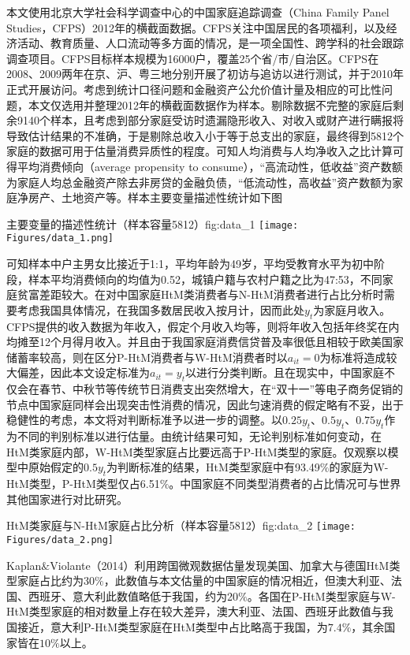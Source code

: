 \documentclass[supercite]{HustGraduPaper}
\begin{document}
    本文使用北京大学社会科学调查中心的中国家庭追踪调查（China Family Panel Studies，CFPS）2012年的横截面数据。CFPS关注中国居民的各项福利，以及经济活动、教育质量、人口流动等多方面的情况，是一项全国性、跨学科的社会跟踪调查项目。CFPS目标样本规模为16000户，覆盖25个省/市/自治区。CFPS在2008、2009两年在京、沪、粤三地分别开展了初访与追访以进行测试，并于2010年正式开展访问。考虑到统计口径问题和金融资产公允价值计量及相应的可比性问题，本文仅选用并整理2012年的横截面数据作为样本。剔除数据不完整的家庭后剩余9140个样本，且考虑到部分家庭受访时遗漏隐形收入、对收入或财产进行瞒报将导致估计结果的不准确，于是剔除总收入小于等于总支出的家庭，最终得到5812个家庭的数据可用于估量消费异质性的程度。可知人均消费与人均净收入之比计算可得平均消费倾向（average propensity to consume），“高流动性，低收益”资产数额为家庭人均总金融资产除去非房贷的金融负债，“低流动性，高收益”资产数额为家庭净房产、土地资产等。样本主要变量描述性统计如下图
    \begin{generalfig}[htbp]{主要变量的描述性统计（样本容量5812）}{fig:data_1}
    \texttt{[image: Figures/data\_1.png]}
    \end{generalfig}
    
    可知样本中户主男女比接近于1:1，平均年龄为49岁，平均受教育水平为初中阶段，样本平均消费倾向的均值为0.52，城镇户籍与农村户籍之比为47:53，不同家庭贫富差距较大。在对中国家庭HtM类消费者与N-HtM消费者进行占比分析时需要考虑我国具体情况，在我国多数居民收入按月计，因而此处$y_t$为家庭月收入。CFPS提供的收入数据为年收入，假定个月收入均等，则将年收入包括年终奖在内均摊至12个月得月收入。并且由于我国家庭消费信贷普及率很低且相较于欧美国家储蓄率较高，则在区分P-HtM消费者与W-HtM消费者时以$a_{it}=0$为标准将造成较大偏差，因此本文设定标准为$a_{it}=y_t$以进行分类判断。且在现实中，中国家庭不仅会在春节、中秋节等传统节日消费支出突然增大，在“双十一”等电子商务促销的节点中国家庭同样会出现突击性消费的情况，因此匀速消费的假定略有不妥，出于稳健性的考虑，本文将对判断标准予以进一步的调整。以$0.25y_t$、$0.5y_t$、$0.75y_t$作为不同的判别标准以进行估量。由统计结果可知，无论判别标准如何变动，在HtM类家庭内部，W-HtM类型家庭占比要远高于P-HtM类型的家庭。仅观察以模型中原始假定的$0.5y_t$为判断标准的结果，HtM类型家庭中有93.49$\%$的家庭为W-HtM类型，P-HtM类型仅占6.51$\%$。中国家庭不同类型消费者的占比情况可与世界其他国家进行对比研究。
    \begin{generalfig}[htbp]{HtM类家庭与N-HtM家庭占比分析（样本容量5812）}{fig:data_2}
    \texttt{[image: Figures/data\_2.png]}
    \end{generalfig}
    
    Kaplan$\&$Violante（2014）利用跨国微观数据估量发现美国、加拿大与德国HtM类型家庭占比约为30$\%$，此数值与本文估量的中国家庭的情况相近，但澳大利亚、法国、西班牙、意大利此数值略低于我国，约为20$\%$。各国在P-HtM类型家庭与W-HtM类型家庭的相对数量上存在较大差异，澳大利亚、法国、西班牙此数值与我国接近，意大利P-HtM类型家庭在HtM类型中占比略高于我国，为$7.4\%$，其余国家皆在$10\%$以上。
\end{document}
